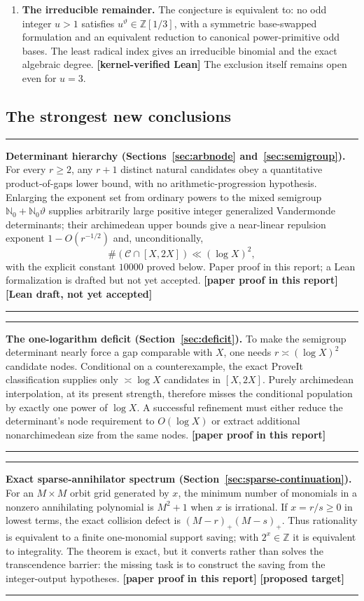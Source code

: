 \documentclass[11pt,oneside]{article}
\theoremstyle{definition}
\theoremstyle{remark}
\newcommand{\Nzero}{\mathbb N_0}
\newcommand{\Z}{\mathbb Z}
\newcommand{\thetaq}{\vartheta}
\newcommand{\Cand}{\mathcal C}
\newcommand{\Zthree}{\Z[1/3]}
\newcommand{\statuslean}{\textcolor{leanblue}{\textbf{[kernel-verified Lean]}}}
\newcommand{\statusnew}{\textcolor{newgreen}{\textbf{[paper proof in this report]}}}
\newcommand{\statusdraft}{\textcolor{computeviolet}{\textbf{[Lean draft, not yet accepted]}}}
\newcommand{\statusopen}{\textcolor{classicalgray}{\textbf{[proposed target]}}}
\newenvironment{resultbox}
{\begin{center}\begin{minipage}{0.94\textwidth}\hrule\vspace{0.45em}}
{\vspace{0.35em}\hrule\end{minipage}\end{center}}
\begin{document}
\begin{enumerate}
\item \textbf{The irreducible remainder.}  The conjecture is equivalent to: no odd integer
$u>1$ satisfies $u^{\thetaq}\in\Zthree$, with a symmetric base-swapped formulation and an
equivalent reduction to canonical power-primitive odd bases.  The least radical index gives an
irreducible binomial and the exact algebraic degree.  \statuslean{}  The exclusion itself
remains open even for $u=3$.
\end{enumerate}

\subsection{The strongest new conclusions}
\label{ex:newconclusions}

\begin{resultbox}
\textbf{Determinant hierarchy (Sections~\ref{sec:arbnode} and~\ref{sec:semigroup}).}
For every $r\ge2$, any $r+1$ distinct natural candidates obey a quantitative product-of-gaps
lower bound, with no arithmetic-progression hypothesis.  Enlarging the exponent set from
ordinary powers to the mixed semigroup $\Nzero+\Nzero\thetaq$ supplies arbitrarily large
positive integer generalized Vandermonde determinants; their archimedean upper bounds give a
near-linear repulsion exponent $1-O(r^{-1/2})$ and, unconditionally,
\[
  \#(\Cand\cap[X,2X])\ll(\log X)^2,
\]
with the explicit constant $10000$ proved below.  Paper proof in this report; a Lean
formalization is drafted but not yet accepted.  \statusnew{} \statusdraft
\end{resultbox}

\begin{resultbox}
\textbf{The one-logarithm deficit (Section~\ref{sec:deficit}).}
To make the semigroup determinant nearly force a gap comparable with $X$, one needs
$r\asymp(\log X)^2$ candidate nodes.  Conditional on a counterexample, the exact ProveIt
classification supplies only $\asymp\log X$ candidates in $[X,2X]$.  Purely archimedean
interpolation, at its present strength, therefore misses the conditional population by exactly
one power of $\log X$.  A successful refinement must either reduce the determinant's node
requirement to $O(\!\log X)$ or extract additional nonarchimedean size from the same nodes.
\statusnew
\end{resultbox}

\begin{resultbox}
\textbf{Exact sparse-annihilator spectrum (Section~\ref{sec:sparse-continuation}).}
For an $M\times M$ orbit grid generated by $x$, the minimum number of monomials in a nonzero
annihilating polynomial is $M^2+1$ when $x$ is irrational.  If $x=r/s\ge0$ in lowest terms,
the exact collision defect is $(M-r)_+(M-s)_+$.  Thus rationality is equivalent to a finite
one-monomial support saving; with $2^x\in\Z$ it is equivalent to integrality.  The theorem is
exact, but it converts rather than solves the transcendence barrier: the missing task is to
construct the saving from the integer-output hypotheses.  \statusnew{} \statusopen
\end{resultbox}
\end{document}

